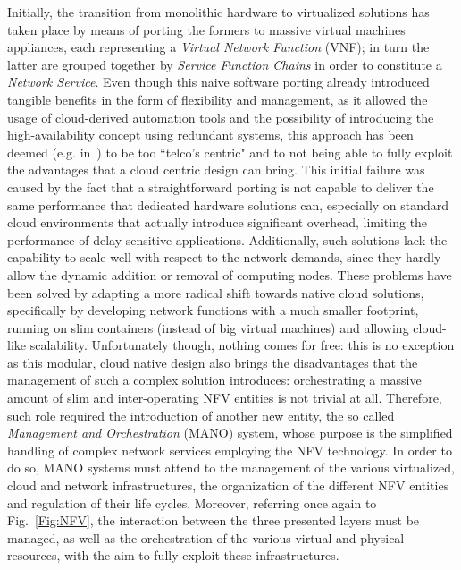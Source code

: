 \documentclass[11pt]{book}
\begin{document}
Initially, the transition from monolithic hardware to virtualized solutions has taken place by means of porting the formers to massive virtual machines appliances, each representing a \textit{Virtual Network Function} (VNF); in turn the latter are grouped together by \textit{Service Function Chains} in order to constitute a \textit{Network Service}. Even though this naive software porting already introduced tangible benefits in the form of flexibility and management, as it allowed the usage of cloud-derived automation tools and the possibility of introducing the high-availability concept using redundant systems, this approach has been deemed (e.g. in~\cite{taylor2015}) to be too ``telco's centric" and to not being able to fully exploit the advantages that a cloud centric design can bring. This initial failure was caused by the fact that a straightforward porting is not capable to deliver the same performance that dedicated hardware solutions can, especially on standard cloud environments that actually introduce significant overhead, limiting the performance of delay sensitive applications. Additionally, such solutions lack the capability to scale well with respect to the network demands, since they hardly allow the dynamic addition or removal of computing nodes. These problems have been solved by adapting a more radical shift towards native cloud solutions, specifically by developing network functions with a much smaller footprint, running on slim containers (instead of big virtual machines) and allowing cloud-like scalability.
Unfortunately though, nothing comes for free: this is no exception as this modular, cloud native design also brings the disadvantages that the management of such a complex solution introduces: orchestrating a massive amount of slim and inter-operating NFV entities is not trivial at all. Therefore, such role required the introduction of another new entity, the so called \textit{Management and Orchestration} (MANO) system, whose purpose is the simplified handling of complex network services employing the NFV technology. In order to do so, MANO systems must attend to the management of the various virtualized, cloud and network infrastructures, the organization of the different NFV entities and regulation of their life cycles. Moreover, referring once again to Fig.~\ref{Fig:NFV}, the interaction between the three presented layers must be managed, as well as the orchestration of the various virtual and physical resources, with the aim to fully exploit these infrastructures.
\end{document}
